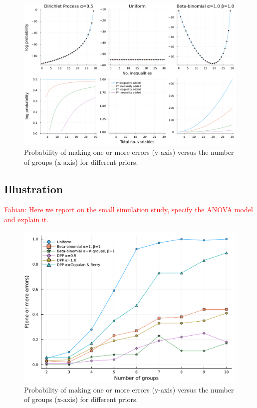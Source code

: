\documentclass[11pt,a4paper]{article}
\theoremstyle{definition} %
\theoremstyle{case}
\newcommand{\FD}[1]{\textcolor{red}{Fabian: #1 }}
\begin{document}
\begin{figure}
    \centering
    \includegraphics[width=\textwidth]{figures/prior_comparison_plot_2x4_without_log_without_betabinomial.pdf}
    \caption{Probability of making one or more errors (y-axis) versus the number of groups (x-axis) for different priors.}
    \label{fig:scott_berger}
\end{figure}

\subsection{Illustration} \label{sec:illustration}
\FD{Here we report on the small simulation study, specify the ANOVA model and explain it.}

\begin{figure}
    \centering
    \includegraphics[width=\textwidth]{figures/one_or_more_errors2.pdf}
    \caption{Probability of making one or more errors (y-axis) versus the number of groups (x-axis) for different priors.}
    \label{fig:small_simulation}
\end{figure}
\end{document}
